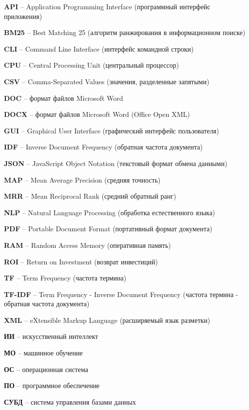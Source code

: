 	
	
	\noindent
	\textbf{API} – Application Programming Interface (программный интерфейс приложения)
	
	\noindent
	\textbf{BM25} – Best Matching 25 (алгоритм ранжирования в информационном поиске)
	
	\noindent
	\textbf{CLI} – Command Line Interface (интерфейс командной строки)
	
	\noindent
	\textbf{CPU} – Central Processing Unit (центральный процессор)
	
	\noindent
	\textbf{CSV} – Comma-Separated Values (значения, разделенные запятыми)
	
	\noindent
	\textbf{DOC} – формат файлов Microsoft Word
	
	\noindent
	\textbf{DOCX} – формат файлов Microsoft Word (Office Open XML)
	
	\noindent
	\textbf{GUI} – Graphical User Interface (графический интерфейс пользователя)
	
	\noindent
	\textbf{IDF} – Inverse Document Frequency (обратная частота документа)
	
	\noindent
	\textbf{JSON} – JavaScript Object Notation (текстовый формат обмена данными)
	
	\noindent
	\textbf{MAP} – Mean Average Precision (средняя точность)
	
	\noindent
	\textbf{MRR} – Mean Reciprocal Rank (средний обратный ранг)
	
	\noindent
	\textbf{NLP} – Natural Language Processing (обработка естественного языка)
	
	\noindent
	\textbf{PDF} – Portable Document Format (портативный формат документа)
	
	\noindent
	\textbf{RAM} – Random Access Memory (оперативная память)
	
	\noindent
	\textbf{ROI} – Return on Investment (возврат инвестиций)
	
	\noindent
	\textbf{TF} – Term Frequency (частота термина)
	
	\noindent
	\textbf{TF-IDF} – Term Frequency - Inverse Document Frequency (частота термина - обратная частота документа)
	
	\noindent
	\textbf{XML} – eXtensible Markup Language (расширяемый язык разметки)
	
	\noindent
	\textbf{ИИ} – искусственный интеллект
	
	\noindent
	\textbf{МО} – машинное обучение
	
	\noindent
	\textbf{ОС} – операционная система
	
	\noindent
	\textbf{ПО} – программное обеспечение
	
	\noindent
	\textbf{СУБД} – система управления базами данных
	
\clearpage